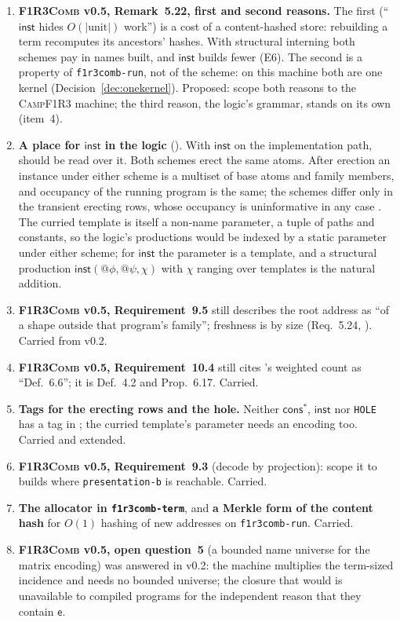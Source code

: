 \documentclass[11pt,a4paper]{article}
\makeatletter
\newcommand{\code}[1]{\texttt{#1}}
\newcommand{\Comb}{\textsc{F1R3Comb}}
\newcommand{\Camp}{\textsc{CampF1R3}}
\newcommand{\quo}[1]{@#1}
\newcommand{\ev}{\mathsf{e}}
\theoremstyle{definition}
\theoremstyle{plain}
\newcommand{\inst}{\mathsf{inst}}
\newcommand{\cstar}{\mathsf{cons}^{*}}
\makeatother
\begin{document}
\begin{enumerate}[leftmargin=1.8em]
\item \textbf{\Comb{} v0.5, Remark~5.22, first and second reasons.} The first
(``$\inst$ hides $O(|\mathrm{unit}|)$ work'') is a cost of a content-hashed
store: rebuilding a term recomputes its ancestors' hashes. With structural
interning both schemes pay in names built, and $\inst$ builds fewer (E6). The
second is a property of \code{f1r3comb-run}, not of the scheme: on this
machine both are one kernel (Decision~\ref{dec:onekernel}). Proposed: scope
both reasons to the \Camp{} machine; the third reason, the logic's grammar,
stands on its own (item~4).

\item \textbf{A place for $\inst$ in the logic} (\cite[\S14, item~4]{combspec}).
With $\inst$ on the implementation path, \cite{logic} should be read over it.
Both schemes erect the same atoms.
After erection an instance under either scheme is a multiset of base atoms
and family members, and occupancy of the running program is the same; the
schemes differ only in the transient erecting rows, whose occupancy is
uninformative in any case \cite[Req.~10.1]{combspec}. The curried template
is itself a non-name parameter, a tuple of paths and constants, so the
logic's productions would be indexed by a static parameter under either
scheme; for $\inst$ the parameter is a template, and a structural production
$\inst(\quo{\phi},\quo{\psi},\chi)$ with $\chi$ ranging over templates is the
natural addition.

\item \textbf{\Comb{} v0.5, Requirement~9.5} still describes the root address
as ``of a shape outside that program's family''; freshness is by size
(Req.~5.24, \cite[Lem.~6.14]{draft3}). Carried from v0.2.

\item \textbf{\Comb{} v0.5, Requirement~10.4} still cites \cite{logic}'s
weighted count as ``Def.~6.6''; it is Def.~4.2 and Prop.~6.17. Carried.

\item \textbf{Tags for the erecting rows and the hole.} Neither $\cstar$,
$\inst$ nor \code{HOLE} has a tag in \cite[Req.~4.11]{combspec}; the curried
template's parameter needs an encoding too. Carried and extended.

\item \textbf{\Comb{} v0.5, Requirement~9.3} (decode by projection): scope it
to builds where \code{presentation-b} is reachable. Carried.

\item \textbf{The allocator in \code{f1r3comb-term}}, and \textbf{a Merkle
form of the content hash} for $O(1)$ hashing of new addresses on
\code{f1r3comb-run}. Carried.

\item \textbf{\Comb{} v0.5, open question~5} (a bounded name universe for the
matrix encoding) was answered in v0.2: the machine multiplies the term-sized
incidence and needs no bounded universe; the closure that would is
unavailable to compiled programs for the independent reason that they
contain $\ev$.

\end{enumerate}
\end{document}
